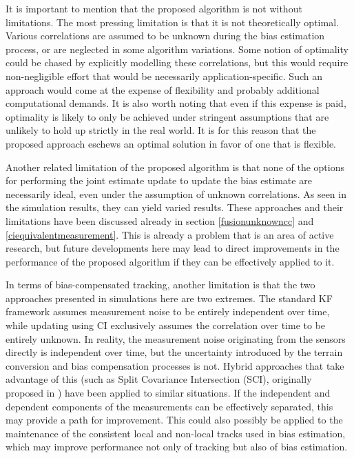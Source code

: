 \documentclass[journal]{IEEEtran}
\begin{document}
It is important to mention that the proposed algorithm is not without limitations. The most pressing limitation is that it is not theoretically optimal. Various correlations are assumed to be unknown during the bias estimation process, or are neglected in some algorithm variations. Some notion of optimality could be chased by explicitly modelling these correlations, but this would require non-negligible effort that would be necessarily application-specific. Such an approach would come at the expense of flexibility and probably additional computational demands. It is also worth noting that even if this expense is paid, optimality is likely to only be achieved under stringent assumptions that are unlikely to hold up strictly in the real world. It is for this reason that the proposed approach eschews an optimal solution in favor of one that is flexible.

Another related limitation of the proposed algorithm is that none of the options for performing the joint estimate update to update the bias estimate are necessarily ideal, even under the assumption of unknown correlations. As seen in the simulation results, they can yield varied results. These approaches and their limitations have been discussed already in section \ref{fusionunknowncc} and \ref{ciequivalentmeasurement}. This is already a problem that is an area of active research, but future developments here may lead to direct improvements in the performance of the proposed algorithm if they can be effectively applied to it.

In terms of bias-compensated tracking, another limitation is that the two approaches presented in simulations here are two extremes. The standard KF framework assumes measurement noise to be entirely independent over time, while updating using CI exclusively assumes the correlation over time to be entirely unknown. In reality, the measurement noise originating from the sensors directly is independent over time, but the uncertainty introduced by the terrain conversion and bias compensation processes is not. Hybrid approaches that take advantage of this (such as Split Covariance Intersection (SCI), originally proposed in \cite{julier2007using}) have been applied to similar situations. If the independent and dependent components of the measurements can be effectively separated, this may provide a path for improvement. This could also possibly be applied to the maintenance of the consistent local and non-local tracks used in bias estimation, which may improve performance not only of tracking but also of bias estimation.
\end{document}
